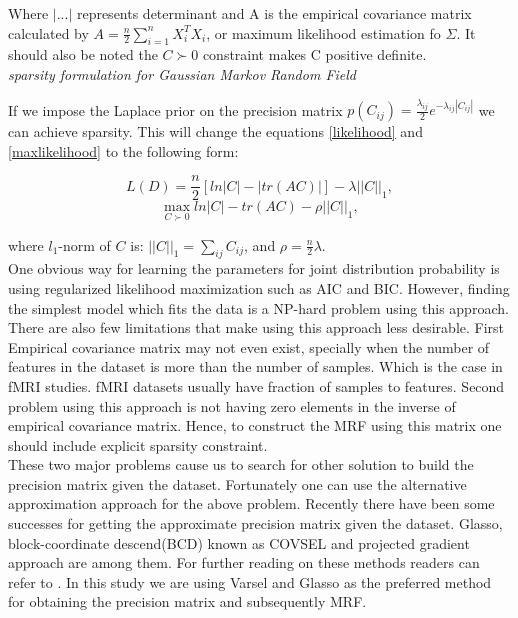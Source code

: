 \documentclass{article} %
\begin{document}
Where $|...|$ represents determinant and A is the empirical covariance 
matrix calculated by $A = \frac{n}{2} \sum_{i=1}^{n} X_i^T X_i$, or 
maximum likelihood estimation fo $\Sigma$. It should also be noted 
the $C\succ0$ constraint makes C positive definite.\\


\textit{sparsity formulation for Gaussian Markov Random Field }

If we impose the Laplace prior on the precision matrix 
$p(C_{ij}) = \frac{\lambda_{ij}}{2} e^{-\lambda_{ij}|C_{ij}|}$ we can achieve 
sparsity. This will change the equations \eqref{likelihood} and 
\eqref{maxlikelihood} to the following form:

\begin{multicols}{2}
\begin{equation}
L(D) = \frac{n}{2} [ln|C| -  |tr(AC)|] - \lambda||C||_{1}, 
\end{equation}\break
\begin{equation}
\max_{C\succ0} ln|C| - tr(AC) - \rho||C||_{1},
\end{equation}
\end{multicols}

where $l_{1}$-norm of $C$ is: $||C||_{1}= \sum_{ij}C_{ij}$, and $\rho=\frac{n}{2}\lambda $. \\

  
One obvious way for learning the parameters for joint distribution probability 
is using regularized likelihood maximization such as AIC and BIC. However, 
finding the simplest model which fits the data is a NP-hard problem using this 
approach. There are also few limitations that make using this approach less 
desirable. First Empirical covariance matrix may not even exist, specially when 
the number of features in the dataset is more than the number of samples. Which 
is the case in fMRI studies. fMRI datasets usually have fraction of samples to 
features. Second problem using this approach is not having zero elements in the 
inverse of empirical covariance matrix. Hence, to construct the MRF using this 
matrix one should include explicit sparsity constraint.\cite{Rish2014Book} \\

These two major problems cause us to search for other solution to build the 
precision matrix given the dataset. Fortunately one can use the alternative 
approximation approach for the above problem. Recently there have been some 
successes for getting the approximate precision matrix given the dataset. 
Glasso\cite{glasso}, block-coordinate descend(BCD) known as COVSEL and projected gradient 
approach are among them. For further reading on these methods readers can 
refer to \cite{Rish2014Book}. In this study we are using Varsel and Glasso as 
the preferred method for obtaining the precision matrix and subsequently MRF.   
\end{document}
